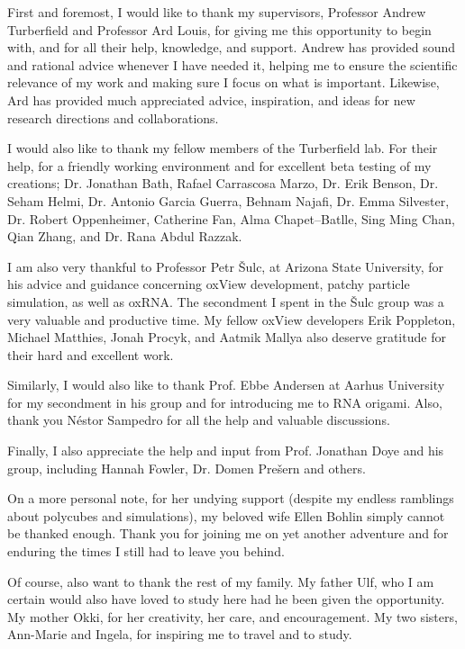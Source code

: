 

First and foremost, I would like to thank my supervisors, Professor Andrew Turberfield and Professor Ard Louis, for giving me this opportunity to begin with, and for all their help, knowledge, and support. Andrew has provided sound and rational advice whenever I have needed it, helping me to ensure the scientific relevance of my work and making sure I focus on what is important. Likewise, Ard has provided much appreciated advice, inspiration, and ideas for new research directions and collaborations.

I would also like to thank my fellow members of the Turberfield lab. For their help, for a friendly working environment and for excellent beta testing of my creations; Dr. Jonathan Bath, Rafael Carrascosa Marzo, Dr. Erik Benson, Dr. Seham Helmi, Dr. Antonio Garcia Guerra, Behnam Najafi, Dr. Emma Silvester, Dr. Robert Oppenheimer, Catherine Fan, Alma Chapet--Batlle, Sing Ming Chan, Qian Zhang, and Dr. Rana Abdul Razzak.

I am also very thankful to Professor Petr {\v{S}}ulc, at Arizona State University, for his advice and guidance concerning oxView development, patchy particle simulation, as well as oxRNA. The secondment I spent in the {\v{S}}ulc group was a very valuable and productive time. My fellow oxView developers Erik Poppleton, Michael Matthies, Jonah Procyk, and Aatmik Mallya also deserve gratitude for their hard and excellent work.

Similarly, I would also like to thank Prof. Ebbe Andersen at Aarhus University for my secondment in his group and for introducing me to RNA origami. Also, thank you Néstor Sampedro for all the help and valuable discussions.

Finally, I also appreciate the help and input from Prof. Jonathan Doye and his group, including Hannah Fowler, Dr. Domen Prešern and others.

On a more personal note, for her undying support (despite my endless ramblings about polycubes and simulations), my beloved wife Ellen Bohlin simply cannot be thanked enough. Thank you for joining me on yet another adventure and for enduring the times I still had to leave you behind. 

Of course, also want to thank the rest of my family. My father Ulf, who I am certain would also have loved to study here had he been given the opportunity. My mother Okki, for her creativity, her care, and encouragement. My two sisters, Ann-Marie and Ingela, for inspiring me to travel and to study.

